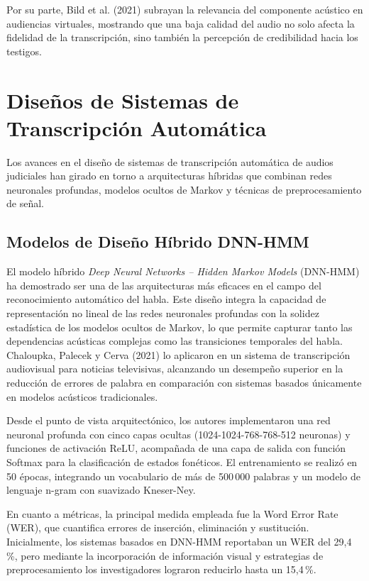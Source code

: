 \documentclass[12pt,a4paper,oneside]{report}
\begin{document}
Por su parte, Bild et al. (2021) subrayan la relevancia del componente acústico en audiencias virtuales, mostrando que una baja calidad del audio no solo afecta la fidelidad de la transcripción, sino también la percepción de credibilidad hacia los testigos.

\section{Diseños de Sistemas de Transcripción Automática}

Los avances en el diseño de sistemas de transcripción automática de audios judiciales han girado en torno a arquitecturas híbridas que combinan redes neuronales profundas, modelos ocultos de Markov y técnicas de preprocesamiento de señal.

\subsection{Modelos de Diseño Híbrido DNN-HMM}

El modelo híbrido \textit{Deep Neural Networks -- Hidden Markov Models} (DNN-HMM) ha demostrado ser una de las arquitecturas más eficaces en el campo del reconocimiento automático del habla. Este diseño integra la capacidad de representación no lineal de las redes neuronales profundas con la solidez estadística de los modelos ocultos de Markov, lo que permite capturar tanto las dependencias acústicas complejas como las transiciones temporales del habla. Chaloupka, Palecek y Cerva (2021) lo aplicaron en un sistema de transcripción audiovisual para noticias televisivas, alcanzando un desempeño superior en la reducción de errores de palabra en comparación con sistemas basados únicamente en modelos acústicos tradicionales.

Desde el punto de vista arquitectónico, los autores implementaron una red neuronal profunda con cinco capas ocultas (1024-1024-768-768-512 neuronas) y funciones de activación ReLU, acompañada de una capa de salida con función Softmax para la clasificación de estados fonéticos. El entrenamiento se realizó en 50 épocas, integrando un vocabulario de más de 500\,000 palabras y un modelo de lenguaje n-gram con suavizado Kneser-Ney.

En cuanto a métricas, la principal medida empleada fue la Word Error Rate (WER), que cuantifica errores de inserción, eliminación y sustitución. Inicialmente, los sistemas basados en DNN-HMM reportaban un WER del 29,4\,\%, pero mediante la incorporación de información visual y estrategias de preprocesamiento los investigadores lograron reducirlo hasta un 15,4\,\%.
\end{document}
